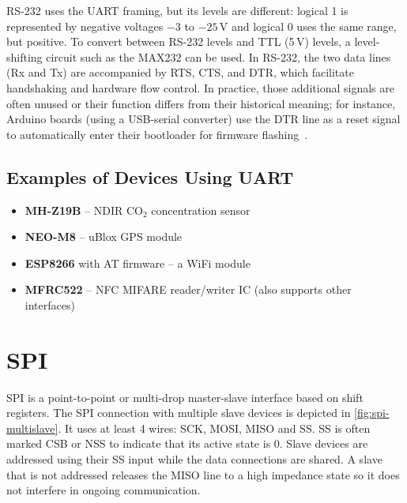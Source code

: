 RS-232 uses the \gls{UART} framing, but its levels are different: logical 1 is represented by negative voltages $-3$ to $-25$\,V and logical 0 uses the same range, but positive. To convert between RS-232 levels and \gls{TTL} (5\,V) levels, a level-shifting circuit such as the MAX232 can be used. In RS-232, the two data lines (Rx and Tx) are accompanied by \gls{RTS}, \gls{CTS}, and \gls{DTR}, which facilitate handshaking and hardware flow control. In practice, those additional signals are often unused or their function differs from their historical meaning; for instance, Arduino boards (using a USB-serial converter) use the \gls{DTR} line as a reset signal to automatically enter their bootloader for firmware flashing~\cite{arduinodtr}.

\subsection{Examples of Devices Using UART}

\begin{itemize}
	\item \textbf{MH-Z19B} -- \gls{NDIR} CO$_2$ concentration sensor
	\item \textbf{NEO-M8} -- uBlox \gls{GPS} module
	\item \textbf{ESP8266} with AT firmware -- a WiFi module
	\item \textbf{MFRC522} -- \gls{NFC} MIFARE reader/writer \gls{IC} (also supports other interfaces)
\end{itemize}

\section{SPI} \label{sec:theory-spi}

\acrfull{SPI} is a point-to-point or multi-drop master-slave interface based on shift registers. The \gls{SPI} connection with multiple slave devices is depicted in \cref{fig:spi-multislave}. It uses at least 4 wires: \gls{SCK}, \gls{MOSI}, \gls{MISO} and \gls{SS}. \gls{SS} is often marked \gls{CSB} or \gls{NSS} to indicate that its active state is 0. Slave devices are addressed using their \gls{SS} input while the data connections are shared. A slave that is not addressed releases the \gls{MISO} line to a high impedance state so it does not interfere in ongoing communication.

